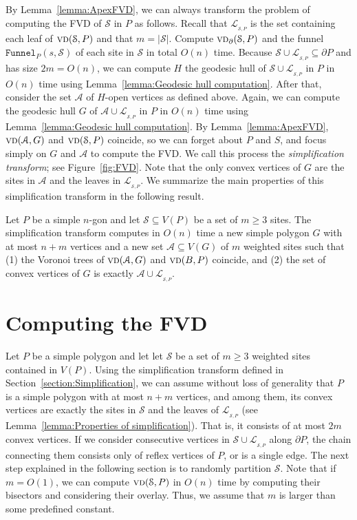 \documentclass[a4paper,UKenglish]{socg-lipics-v2018}
\newcommand{\s}{\mathcal S}
\newcommand{\funnel}[2][P]{\ensuremath{\mathtt{Funnel}_{\scriptscriptstyle #1}(#2)}}
\newcommand{\vd}[2][P]{\textsc{vd}(#2, #1)}
\newcommand{\bvd}[2][P]{\textsc{vd}_{\partial}(#2, #1)}
\newcommand{\LL}[1][\s, P]{\ensuremath{\mathcal L_{_{#1}}}}
\newcommand{\A}{\ensuremath{\mathcal A}}
\begin{document}
By Lemma~\ref{lemma:ApexFVD}, we can always transform the problem of computing the FVD of $\s$ in $P$ as follows. 
Recall that $\LL$ is the set containing each leaf of $\vd{\s}$ and that $m= |\s|$.
Compute $\bvd{\s}$ and the funnel $\funnel{s, \s}$ of each site in $\s$ in total $O(n)$ time. 
Because $\s\cup \LL\subseteq \partial P$ and has size $2 m = O(n)$, we can compute $H$ the geodesic hull of $\s\cup \LL$ in $P$ in $O(n)$ time using Lemma~\ref{lemma:Geodesic hull computation}. 
After that, consider the set $\A$ of $H$-open vertices as defined above.
Again, we can compute the geodesic hull $G$ of $\A\cup \LL$ in $P$ in $O(n)$ time using Lemma~\ref{lemma:Geodesic hull computation}. 
By Lemma~\ref{lemma:ApexFVD}, $\vd[G]{\A}$ and $\vd{\s}$ coincide, so we can forget about $P$ and $S$, and focus simply on $G$ and $\A$ to compute the FVD.
We call this process the \emph{simplification transform}; see Figure~\ref{fig:FVD}. 
Note that the only convex vertices of $G$ are the sites in $\A$ and the leaves in $\LL$. 
We summarize the main properties of this simplification transform in the following result.

\begin{lemma}\label{lemma:Properties of simplification}
Let  $P$ be a simple $n$-gon and let $\s\subseteq V(P)$ be a set of $m\geq 3$ sites.
The simplification transform computes in $O(n)$ time a new simple polygon $G$ with at most $n+m$ vertices and a new set $\A\subseteq V(G)$ of $m$ weighted sites such that (1) the Voronoi trees of $\vd[G]{\A}$ and $\vd[P]{B}$ coincide, and (2) the set of convex vertices of $G$ is exactly $\A\cup \LL$.
\end{lemma}



\section{Computing the FVD}
Let  $P$ be a simple polygon and let let $\s$ be a set of $m\geq 3$ weighted sites contained in $V(P)$.
Using the simplification transform defined in Section~\ref{section:Simplification}, we can assume without loss of generality that $P$ is a simple polygon with at most $n+m$ vertices, and among them, its convex vertices are exactly the sites in $\s$ and the leaves of $\LL$ (see Lemma~\ref{lemma:Properties of simplification}). 
That is, it consists of at most $2m$ convex vertices.
If we consider consecutive vertices in $\s\cup \LL$ along $\partial P$, the chain connecting them consists only of reflex vertices of $P$, or is a single edge. 
The next step explained in the following section is to randomly partition $\s$.
Note that if $m = O(1)$, we can compute $\vd{\s}$ in $O(n)$ time by computing their bisectors and considering their overlay. Thus, we assume that $m$ is larger than some predefined constant.
\end{document}
